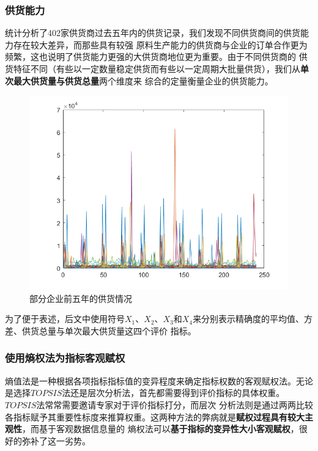 \documentclass{cumcmthesis}
\begin{document}
\subsubsection*{供货能力}
统计分析了402家供货商过去五年内的供货记录，我们发现不同供货商间的供货能力存在较大差异，而那些具有较强
原料生产能力的供货商与企业的订单合作更为频繁，这也说明了供货能力更强的大供货商地位更为重要。由于不同供货商的
供货特征不同（有些以一定数量稳定供货而有些以一定周期大批量供货），我们从\textbf{单次最大供货量与供货总量}两个维度来
综合的定量衡量企业的供货能力。\par
\begin{figure}[htbp]
    \centering
    \includegraphics[scale=0.6]{offer.png}
    \caption{部分企业前五年的供货情况}     \label{fig:1}
\end{figure}

为了便于表述，后文中使用符号$X_1$、$X_2$、$X_3$和$X_4$来分别表示精确度的平均值、方差、供货总量与单次最大供货量这四个评价
指标。

\subsubsection{使用熵权法为指标客观赋权}
熵值法是一种根据各项指标指标值的变异程度来确定指标权数的客观赋权法。无论是选择$TOPSIS$法还是层次分析法，首先都需要得到评价指标的具体权重。$TOPSIS$法常常需要邀请专家对于评价指标打分，而层次
分析法则是通过两两比较各指标赋予其重要性标度来推算权重。这两种方法的弊病就是\textbf{赋权过程具有较大主观性}，而基于客观数据信息量的
熵权法可以\textbf{基于指标的变异性大小客观赋权}\cite{黄鹏2015福建省土地生态安全AHP法和熵值法动态评价比较}，很好的弥补了这一劣势。
\end{document}
